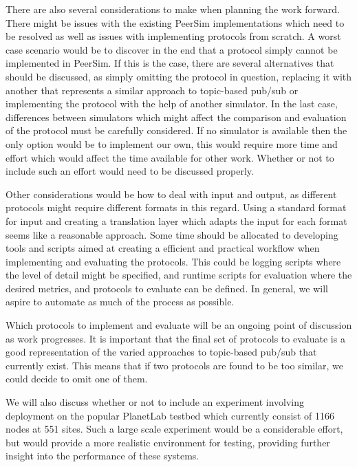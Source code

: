    There are also several considerations to make when planning the work
    forward. There might be issues with the existing PeerSim
    implementations which need to be resolved as well as issues with
    implementing protocols from scratch. A worst case scenario would be
    to discover in the end that a protocol simply cannot be implemented
    in PeerSim. If this is the case, there
    are several alternatives that should be discussed, as simply
    omitting the protocol in question, replacing it with another that
    represents a similar approach to topic-based pub/sub or
    implementing the protocol with the help of another simulator. In the
    last case, differences between simulators which might affect the
    comparison and evaluation of the protocol must be carefully
    considered. If no simulator is available then the only option would be
    to implement our own, this would require more time and effort which
    would affect the time available for other work. Whether or not to
    include such an effort would need to be discussed properly.

    Other considerations would be how to deal with input and output, as
    different protocols might require different formats in this regard.
    Using a standard format for input and creating a translation layer
    which adapts the input for each format seems like a reasonable
    approach. Some time should be allocated to developing
    tools and scripts aimed at creating a efficient and practical
    workflow when implementing and evaluating the protocols. This could
    be logging scripts where the level of detail might be specified, and
    runtime scripts for evaluation where the desired metrics, and
    protocols to evaluate can be defined. In general, we will aspire to
    automate as much of the process as possible.

    Which protocols to implement and evaluate will be an ongoing point
    of discussion as work progresses. It is important that the final set
    of protocols to evaluate is a good representation of the varied
    approaches to topic-based pub/sub that currently exist. This means
    that if two protocols are found to be too similar, we could decide
    to omit one of them. 
    
    We will also discuss whether or not to include an experiment
    involving deployment on the popular PlanetLab \cite{Chun:2003}
    testbed which currently consist of 1166 nodes at 551 sites. Such a
    large scale experiment would be a considerable effort, but would
    provide a more realistic environment for testing, providing further
    insight into the performance of these systems.


